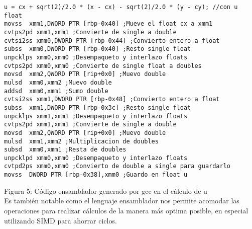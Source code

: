 \begin{lstlisting}
u = cx + sqrt(2)/2.0 * (x - cx) - sqrt(2)/2.0 * (y - cy); //con u float
movss  xmm1,DWORD PTR [rbp-0x40] ;Mueve el float cx a xmm1
cvtps2pd xmm1,xmm1 ;Convierte de single a double
cvtsi2ss xmm0,DWORD PTR [rbp-0x44] ;Convierto entero a float
subss  xmm0,DWORD PTR [rbp-0x40] ;Resto single float
unpcklps xmm0,xmm0 ;Desempaqueto y interlazo floats
cvtps2pd xmm0,xmm0 ;Convierte de single float a doubles
movsd  xmm2,QWORD PTR [rip+0x0] ;Muevo double
mulsd  xmm0,xmm2 ;Muevo double
addsd  xmm0,xmm1 ;Sumo double
cvtsi2ss xmm1,DWORD PTR [rbp-0x48] ;Convierto entero a float
subss  xmm1,DWORD PTR [rbp-0x3c] ;Resto single float
unpcklps xmm1,xmm1 ;Desempaqueto y interlazo floats
cvtps2pd xmm1,xmm1 ;Convierte de single a double
movsd  xmm2,QWORD PTR [rip+0x0] ;Muevo double
mulsd  xmm1,xmm2 ;Multiplicacion de doubles
subsd  xmm0,xmm1 ;Resta de doubles
unpcklpd xmm0,xmm0 ;Desempaqueto y interlazo floats
cvtpd2ps xmm0,xmm0 ;Convierto de double a single para guardarlo
movss  DWORD PTR [rbp-0x38],xmm0 ;Guardo en float u
\end{lstlisting}

Figura 5: Código ensamblador generado por gcc en el cálculo de u \\

Es también notable como el lenguaje ensamblador nos permite acomodar las operaciones para realizar cálculos de la manera más optima posible, en especial utilizando SIMD para ahorrar ciclos.